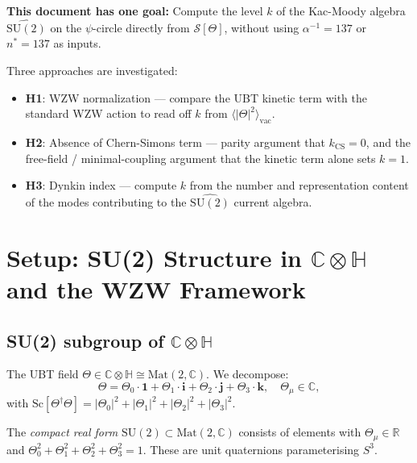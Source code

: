 \documentclass[11pt,a4paper]{article}
\theoremstyle{definition}
\theoremstyle{remark}
\begin{document}
\textbf{This document has one goal:}
Compute the level $k$ of the Kac-Moody algebra $\widehat{\mathrm{SU}(2)}$
on the $\psi$-circle directly from $\mathcal{S}[\Theta]$, without using
$\alpha^{-1} = 137$ or $n^* = 137$ as inputs.

Three approaches are investigated:
\begin{itemize}
  \item \textbf{H1}: WZW normalization — compare the UBT kinetic term
    with the standard WZW action to read off $k$ from $\langle|\Theta|^2\rangle_\mathrm{vac}$.
  \item \textbf{H2}: Absence of Chern-Simons term — parity argument that
    $k_{\mathrm{CS}} = 0$, and the free-field / minimal-coupling argument
    that the kinetic term alone sets $k = 1$.
  \item \textbf{H3}: Dynkin index — compute $k$ from the number and
    representation content of the modes contributing to the
    $\widehat{\mathrm{SU}(2)}$ current algebra.
\end{itemize}

\section{Setup: SU(2) Structure in \texorpdfstring{$\mathbb{C}\otimes\mathbb{H}$}
{C⊗H} and the WZW Framework}
\label{sec:setup}

\subsection{SU(2) subgroup of \texorpdfstring{$\mathbb{C}\otimes\mathbb{H}$}{C⊗H}}

The UBT field $\Theta \in \mathbb{C}\otimes\mathbb{H} \cong \mathrm{Mat}(2,\mathbb{C})$.
We decompose:
\begin{equation}
  \Theta = \Theta_0 \cdot \mathbf{1} + \Theta_1 \cdot \mathbf{i}
         + \Theta_2 \cdot \mathbf{j} + \Theta_3 \cdot \mathbf{k},
  \quad \Theta_\mu \in \mathbb{C},
  \label{eq:Theta_decomp}
\end{equation}
with $\mathrm{Sc}[\Theta^\dagger\Theta] = |\Theta_0|^2 + |\Theta_1|^2
+ |\Theta_2|^2 + |\Theta_3|^2$.

The \emph{compact real form} $\mathrm{SU}(2) \subset \mathrm{Mat}(2,\mathbb{C})$
consists of elements with $\Theta_\mu \in \mathbb{R}$ and
$\Theta_0^2 + \Theta_1^2 + \Theta_2^2 + \Theta_3^2 = 1$.
These are unit quaternions parameterising $S^3$.
\end{document}
